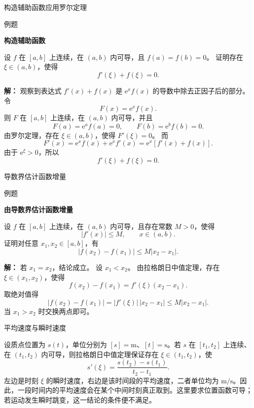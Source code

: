 \documentclass[aspectratio=169,10pt,fontset=fandol]{ctexbeamer}
\newcommand{\ee}{\mathrm{e}}
\begin{document}
\begin{frame}[t,fragile]{构造辅助函数应用罗尔定理}
\small
\begin{block}{例题}
{\small
\textbf{构造辅助函数}\par

设 $f$ 在 $[a,b]$ 上连续，在 $(a,b)$ 内可导，且 $f(a)=f(b)=0$。 证明存在 $\xi\in(a,b)$，使得
\[
f'(\xi)+f(\xi)=0.
\]

}
\end{block}
\pause
{\small
\textbf{解：}
观察到表达式 $f'(x)+f(x)$ 是 $\ee^x f(x)$ 的导数中除去正因子后的部分。 令
\[
F(x)=\ee^x f(x).
\]
则 $F$ 在 $[a,b]$ 上连续，在 $(a,b)$ 内可导，并且
\[
F(a)=\ee^a f(a)=0,\qquad F(b)=\ee^b f(b)=0.
\]
由罗尔定理，存在 $\xi\in(a,b)$，使得 $F'(\xi)=0$。 而
\[
F'(x)=\ee^x f(x)+\ee^x f'(x)=\ee^x[f'(x)+f(x)].
\]
由于 $\ee^\xi>0$，所以
\[
f'(\xi)+f(\xi)=0.
\]

}
\end{frame}
\begin{frame}[t,fragile]{导数界估计函数增量}
\small
\begin{block}{例题}
{\small
\textbf{由导数界估计函数增量}\par

设 $f$ 在 $[a,b]$ 上连续，在 $(a,b)$ 内可导，且存在常数 $M>0$，使得
\[
|f'(x)|\leq M,\qquad x\in(a,b).
\]
证明对任意 $x_1,x_2\in[a,b]$，有
\[
|f(x_2)-f(x_1)|\leq M|x_2-x_1|.
\]

}
\end{block}
\pause
{\small
\textbf{解：}
若 $x_1=x_2$，结论成立。 设 $x_1<x_2$。 由拉格朗日中值定理，存在 $\xi\in(x_1,x_2)$，使得
\[
f(x_2)-f(x_1)=f'(\xi)(x_2-x_1).
\]
取绝对值得
\[
|f(x_2)-f(x_1)|=|f'(\xi)|\,|x_2-x_1|\leq M|x_2-x_1|.
\]
当 $x_1>x_2$ 时交换两点即可。

}
\end{frame}
\begin{frame}[t,fragile]{平均速度与瞬时速度}
\normalsize
{\normalsize
\begin{application}[物理：平均速度与瞬时速度]
设质点位置为 $s(t)$，单位分别为 $[s]=\mathrm m$、$[t]=\mathrm s$。若 $s$ 在 $[t_1,t_2]$ 上连续、在 $(t_1,t_2)$ 内可导，则拉格朗日中值定理保证存在 $\xi\in(t_1,t_2)$，使
\[
s'(\xi)=\frac{s(t_2)-s(t_1)}{t_2-t_1}.
\]
左边是时刻 $\xi$ 的瞬时速度，右边是该时间段的平均速度，二者单位均为 $\mathrm{m/s}$。因此，一段时间内的平均速度会在某个中间时刻真正取到。这里要求位置函数可导；若运动发生瞬时跳变，这一结论的条件便不满足。
\end{application}
}
\end{frame}
\end{document}
